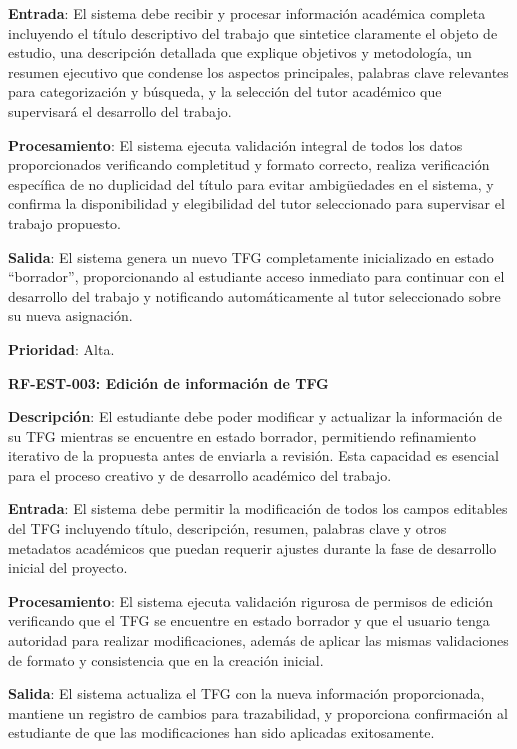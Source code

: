 \documentclass[12pt,a4paper,oneside]{report}
\begin{document}
\textbf{Entrada}: El sistema debe recibir y procesar información académica completa incluyendo el título descriptivo del trabajo que sintetice claramente el objeto de estudio, una descripción detallada que explique objetivos y metodología, un resumen ejecutivo que condense los aspectos principales, palabras clave relevantes para categorización y búsqueda, y la selección del tutor académico que supervisará el desarrollo del trabajo.

\textbf{Procesamiento}: El sistema ejecuta validación integral de todos los datos proporcionados verificando completitud y formato correcto, realiza verificación específica de no duplicidad del título para evitar ambigüedades en el sistema, y confirma la disponibilidad y elegibilidad del tutor seleccionado para supervisar el trabajo propuesto.

\textbf{Salida}: El sistema genera un nuevo TFG completamente inicializado en estado ``borrador'', proporcionando al estudiante acceso inmediato para continuar con el desarrollo del trabajo y notificando automáticamente al tutor seleccionado sobre su nueva asignación.

\textbf{Prioridad}: Alta.

\textbf{RF-EST-003: Edición de información de TFG}

\textbf{Descripción}: El estudiante debe poder modificar y actualizar la información de su TFG mientras se encuentre en estado borrador, permitiendo refinamiento iterativo de la propuesta antes de enviarla a revisión. Esta capacidad es esencial para el proceso creativo y de desarrollo académico del trabajo.

\textbf{Entrada}: El sistema debe permitir la modificación de todos los campos editables del TFG incluyendo título, descripción, resumen, palabras clave y otros metadatos académicos que puedan requerir ajustes durante la fase de desarrollo inicial del proyecto.

\textbf{Procesamiento}: El sistema ejecuta validación rigurosa de permisos de edición verificando que el TFG se encuentre en estado borrador y que el usuario tenga autoridad para realizar modificaciones, además de aplicar las mismas validaciones de formato y consistencia que en la creación inicial.

\textbf{Salida}: El sistema actualiza el TFG con la nueva información proporcionada, mantiene un registro de cambios para trazabilidad, y proporciona confirmación al estudiante de que las modificaciones han sido aplicadas exitosamente.
\end{document}
